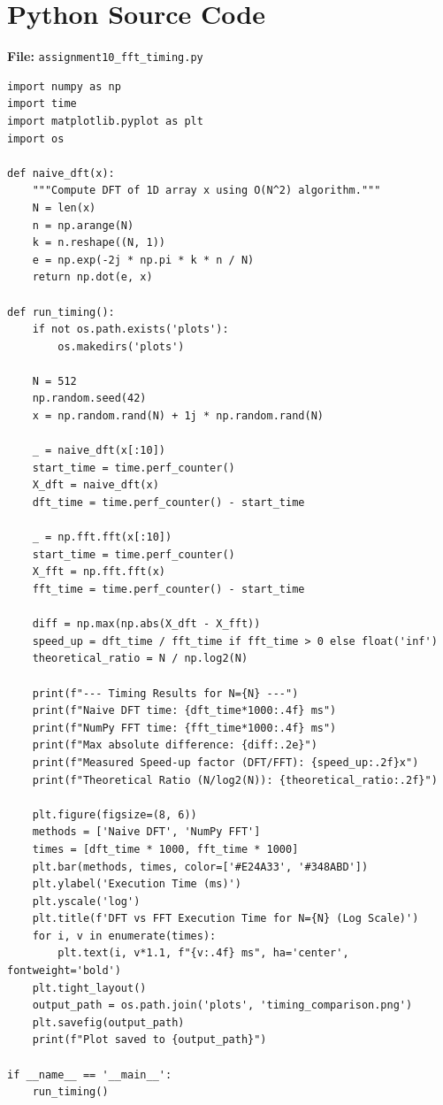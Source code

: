 \documentclass[11pt, a4paper]{article}
\begin{document}
\section{Python Source Code}
\textbf{File:} \texttt{assignment10\_fft\_timing.py}
\begin{lstlisting}[caption={DFT vs. FFT Timing Benchmark -- Assignment 10}]
import numpy as np
import time
import matplotlib.pyplot as plt
import os

def naive_dft(x):
    """Compute DFT of 1D array x using O(N^2) algorithm."""
    N = len(x)
    n = np.arange(N)
    k = n.reshape((N, 1))
    e = np.exp(-2j * np.pi * k * n / N)
    return np.dot(e, x)

def run_timing():
    if not os.path.exists('plots'):
        os.makedirs('plots')

    N = 512
    np.random.seed(42)
    x = np.random.rand(N) + 1j * np.random.rand(N)

    _ = naive_dft(x[:10])
    start_time = time.perf_counter()
    X_dft = naive_dft(x)
    dft_time = time.perf_counter() - start_time

    _ = np.fft.fft(x[:10])
    start_time = time.perf_counter()
    X_fft = np.fft.fft(x)
    fft_time = time.perf_counter() - start_time

    diff = np.max(np.abs(X_dft - X_fft))
    speed_up = dft_time / fft_time if fft_time > 0 else float('inf')
    theoretical_ratio = N / np.log2(N)

    print(f"--- Timing Results for N={N} ---")
    print(f"Naive DFT time: {dft_time*1000:.4f} ms")
    print(f"NumPy FFT time: {fft_time*1000:.4f} ms")
    print(f"Max absolute difference: {diff:.2e}")
    print(f"Measured Speed-up factor (DFT/FFT): {speed_up:.2f}x")
    print(f"Theoretical Ratio (N/log2(N)): {theoretical_ratio:.2f}")

    plt.figure(figsize=(8, 6))
    methods = ['Naive DFT', 'NumPy FFT']
    times = [dft_time * 1000, fft_time * 1000]
    plt.bar(methods, times, color=['#E24A33', '#348ABD'])
    plt.ylabel('Execution Time (ms)')
    plt.yscale('log')
    plt.title(f'DFT vs FFT Execution Time for N={N} (Log Scale)')
    for i, v in enumerate(times):
        plt.text(i, v*1.1, f"{v:.4f} ms", ha='center', fontweight='bold')
    plt.tight_layout()
    output_path = os.path.join('plots', 'timing_comparison.png')
    plt.savefig(output_path)
    print(f"Plot saved to {output_path}")

if __name__ == '__main__':
    run_timing()
\end{lstlisting}
\end{document}
